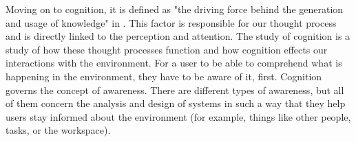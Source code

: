 Moving on to cognition, it is defined as "the driving force behind the generation and usage of knowledge" in \cite{jr_3d_2017}. This factor is responsible for our thought process and is directly linked to the perception and attention. The study of cognition is a study of how these thought processes function and how cognition effects our interactions with the environment.
For a user to be able to comprehend what is happening in the environment, they have to be aware of it, first. Cognition governs the concept of awareness. There are different types of awareness, but all of them concern the analysis and design of systems in such a way that they help users stay informed about the environment (for example, things like other people, tasks, or the workspace).

